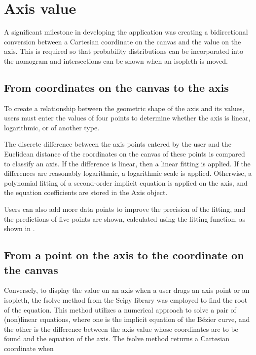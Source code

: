 \documentclass{l4proj}
\begin{document}
\section{Axis value}

A significant milestone in developing the application was creating a bidirectional conversion between a Cartesian coordinate on the canvas and the value on the axis. This is required so that probability distributions can be incorporated into the nomogram and intersections can be shown when an isopleth is moved. 

\subsection{From coordinates on the canvas to the axis}
To create a relationship between the geometric shape of the axis and its values, users must enter the values of four points to determine whether the axis is linear, logarithmic, or of another type. 

The discrete difference between the axis points entered by the user and the Euclidean distance of the coordinates on the canvas of these points is compared to classify an axis. If the difference is linear, then a linear fitting is applied. If the differences are reasonably logarithmic, a logarithmic scale is applied. Otherwise, a polynomial fitting of a second-order implicit equation is applied on the axis, and the equation coefficients are stored in the Axis object. 

Users can also add more data points to improve the precision of the fitting, and the predictions of five points are shown, calculated using the fitting function, as shown in  . 

 \label{fig:axis-equation-fitting}


\subsection{From a point on the axis to the coordinate on the canvas}

Conversely, to display the value on an axis when a user drags an axis point or an isopleth, the fsolve method from the Scipy library was employed to find the root of the equation. This method utilizes a numerical approach to solve a pair of (non)linear equations, where one is the implicit equation of the Bézier curve, and the other is the difference between the axis value whose coordinates are to be found and the equation of the axis. The fsolve method returns a Cartesian coordinate when 
\end{document}
